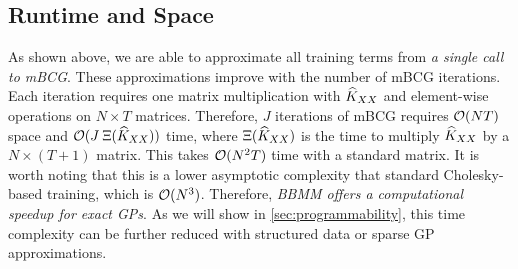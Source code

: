 \subsection{Runtime and Space}
As shown above, we are able to approximate all training terms from \emph{a single call to mBCG}.
These approximations improve with the number of mBCG iterations.
Each iteration requires one matrix multiplication with $\widehat{K}_{XX}$ and element-wise operations on $N \times T$ matrices.
Therefore, $J$ iterations of mBCG requires $\bigo{NT}$ space and $\bigo{J \: \mmm{\trainK}}$ time,
where $\Xi (\widehat{K}_{XX})$ is the time to multiply $\widehat{K}_{XX}$ by a $N \times (T + 1)$ matrix.
This takes $\bigo{N^2 T}$ time with a standard matrix.
It is worth noting that this is a lower asymptotic complexity that standard Cholesky-based training, which is $\bigo{N^3}$.
Therefore, \emph{BBMM offers a computational speedup for exact GPs}.
As we will show in \cref{sec:programmability}, this time complexity can be further reduced with structured data or sparse GP approximations.


